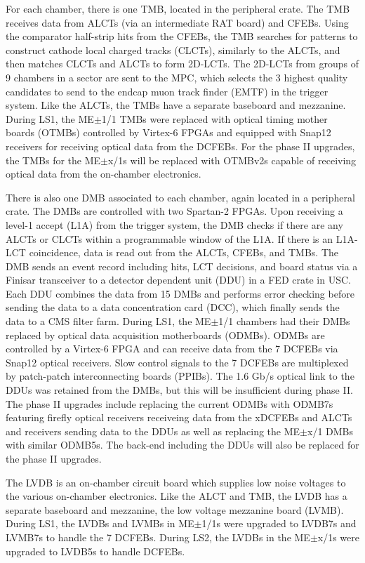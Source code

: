 \documentclass[10pt,a4paper]{article}
\begin{document}
For each chamber, there is one TMB, located in the peripheral crate. The TMB receives data from ALCTs (via an intermediate RAT board) and CFEBs. Using the comparator half-strip hits from the CFEBs, the TMB searches for patterns to construct cathode local charged tracks (CLCTs), similarly to the ALCTs, and then matches CLCTs and ALCTs to form 2D-LCTs. The 2D-LCTs from groups of 9 chambers in a sector are sent to the MPC, which selects the 3 highest quality candidates to send to the endcap muon track finder (EMTF) in the trigger system. Like the ALCTs, the TMBs have a separate baseboard and mezzanine. During LS1, the ME$\pm$1/1 TMBs were replaced with optical timing mother boards (OTMBs) controlled by Virtex-6 FPGAs and equipped with Snap12 receivers for receiving optical data from the DCFEBs. For the phase II upgrades, the TMBs for the ME$\pm$x/1s will be replaced with OTMBv2s capable of receiving optical data from the on-chamber electronics. 

There is also one DMB associated to each chamber, again located in a peripheral crate. The DMBs are controlled with two Spartan-2 FPGAs. Upon receiving a level-1 accept (L1A) from the trigger system, the DMB checks if there are any ALCTs or CLCTs within a programmable window of the L1A. If there is an L1A-LCT coincidence, data is read out from the ALCTs, CFEBs, and TMBs. The DMB sends an event record including hits, LCT decisions, and board status via a Finisar transceiver to a detector dependent unit (DDU) in a FED crate in USC. Each DDU combines the data from 15 DMBs and performs error checking before sending the data to a data concentration card (DCC), which finally sends the data to a CMS filter farm. During LS1, the ME$\pm$1/1 chambers had their DMBs replaced by optical data acquisition motherboards (ODMBs). ODMBs are controlled by a Virtex-6 FPGA and can receive data from the 7 DCFEBs via Snap12 optical receivers. Slow control signals to the 7 DCFEBs are multiplexed by patch-patch interconnecting boards (PPIBs). The 1.6 Gb/s optical link to the DDUs was retained from the DMBs, but this will be insufficient during phase II. The phase II upgrades include replacing the current ODMBs with ODMB7s featuring firefly optical receivers receiveing data from the xDCFEBs and ALCTs and receivers sending data to the DDUs as well as replacing the ME$\pm$x/1 DMBs with similar ODMB5s. The back-end including the DDUs will also be replaced for the phase II upgrades.

The LVDB is an on-chamber circuit board which supplies low noise voltages to the various on-chamber electronics. Like the ALCT and TMB, the LVDB has a separate baseboard and mezzanine, the low voltage mezzanine board (LVMB). During LS1, the LVDBs and LVMBs in ME$\pm$1/1s were upgraded to LVDB7s and LVMB7s to handle the 7 DCFEBs. During LS2, the LVDBs in the ME$\pm$x/1s were upgraded to LVDB5s to handle DCFEBs.
\end{document}
